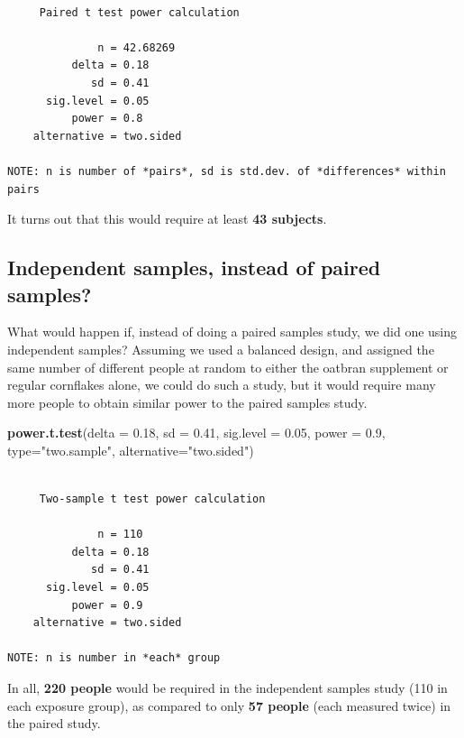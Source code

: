 \documentclass[
]{book}
\newenvironment{Shaded}{\begin{snugshade}}{\end{snugshade}}
\newcommand{\DataTypeTok}[1]{\textcolor[rgb]{0.13,0.29,0.53}{#1}}
\newcommand{\FloatTok}[1]{\textcolor[rgb]{0.00,0.00,0.81}{#1}}
\newcommand{\KeywordTok}[1]{\textcolor[rgb]{0.13,0.29,0.53}{\textbf{#1}}}
\newcommand{\NormalTok}[1]{#1}
\newcommand{\StringTok}[1]{\textcolor[rgb]{0.31,0.60,0.02}{#1}}
\begin{document}
\begin{verbatim}

     Paired t test power calculation 

              n = 42.68269
          delta = 0.18
             sd = 0.41
      sig.level = 0.05
          power = 0.8
    alternative = two.sided

NOTE: n is number of *pairs*, sd is std.dev. of *differences* within pairs
\end{verbatim}

It turns out that this would require at least \textbf{43 subjects}.

\hypertarget{independent-samples-instead-of-paired-samples}{%
\subsection{Independent samples, instead of paired samples?}\label{independent-samples-instead-of-paired-samples}}

What would happen if, instead of doing a paired samples study, we did one using independent samples? Assuming we used a balanced design, and assigned the same number of different people at random to either the oatbran supplement or regular cornflakes alone, we could do such a study, but it would require many more people to obtain similar power to the paired samples study.

\begin{Shaded}
\begin{Highlighting}[]
\KeywordTok{power.t.test}\NormalTok{(}\DataTypeTok{delta =} \FloatTok{0.18}\NormalTok{, }\DataTypeTok{sd =} \FloatTok{0.41}\NormalTok{, }\DataTypeTok{sig.level =} \FloatTok{0.05}\NormalTok{, }
             \DataTypeTok{power =} \FloatTok{0.9}\NormalTok{, }\DataTypeTok{type=}\StringTok{"two.sample"}\NormalTok{, }\DataTypeTok{alternative=}\StringTok{"two.sided"}\NormalTok{)}
\end{Highlighting}
\end{Shaded}

\begin{verbatim}

     Two-sample t test power calculation 

              n = 110
          delta = 0.18
             sd = 0.41
      sig.level = 0.05
          power = 0.9
    alternative = two.sided

NOTE: n is number in *each* group
\end{verbatim}

In all, \textbf{220 people} would be required in the independent samples study (110 in each exposure group), as compared to only \textbf{57 people} (each measured twice) in the paired study.
\end{document}
